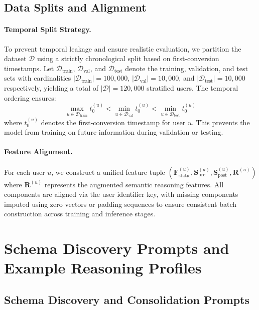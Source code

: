 \subsection{Data Splits and Alignment}
\label{app:data_splits}

\paragraph{Temporal Split Strategy.}
To prevent temporal leakage and ensure realistic evaluation, we partition the dataset $\mathcal{D}$ using a strictly chronological split based on first-conversion timestamps. Let $\mathcal{D}_{\text{train}}$, $\mathcal{D}_{\text{val}}$, and $\mathcal{D}_{\text{test}}$ denote the training, validation, and test sets with cardinalities $|\mathcal{D}_{\text{train}}| = 100{,}000$, $|\mathcal{D}_{\text{val}}| = 10{,}000$, and $|\mathcal{D}_{\text{test}}| = 10{,}000$ respectively, yielding a total of $|\mathcal{D}| = 120{,}000$ stratified users. The temporal ordering ensures:
\begin{equation}
\max_{u \in \mathcal{D}_{\text{train}}} t_0^{(u)} < \min_{u \in \mathcal{D}_{\text{val}}} t_0^{(u)} < \min_{u \in \mathcal{D}_{\text{test}}} t_0^{(u)}
\end{equation}
where $t_0^{(u)}$ denotes the first-conversion timestamp for user $u$. This prevents the model from training on future information during validation or testing.

\paragraph{Feature Alignment.}
For each user $u$, we construct a unified feature tuple $(\mathbf{F}_{\text{static}}^{(u)}, \mathbf{S}_{\text{pre}}^{(u)}, \mathbf{S}_{\text{post}}^{(u)}, \mathbf{R}^{(u)})$ where $\mathbf{R}^{(u)}$ represents the augmented semantic reasoning features. All components are aligned via the user identifier key, with missing components imputed using zero vectors or padding sequences to ensure consistent batch construction across training and inference stages.

\section{Schema Discovery Prompts and Example Reasoning Profiles}
\label{app:examples}

\subsection{Schema Discovery and Consolidation Prompts}
\label{app:discovery_prompts}

